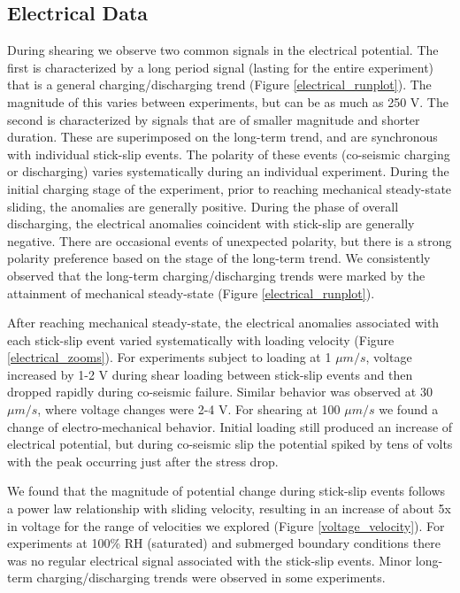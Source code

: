 \subsection{Electrical Data}
During shearing we observe two common signals in the electrical potential.  The first is characterized by a long period signal (lasting for the entire experiment) that is a general charging/discharging trend (Figure \ref{electrical_runplot}).  The magnitude of this varies between experiments, but can be as much as 250 V.  The second is characterized by signals that are of smaller magnitude and shorter duration. These are superimposed on the long-term trend, and are synchronous with individual stick-slip events.  The polarity of these events (co-seismic charging or discharging) varies systematically during an individual experiment.  During the initial charging stage of the experiment, prior to reaching mechanical steady-state sliding, the anomalies are generally positive.  During the phase of overall discharging, the electrical anomalies coincident with stick-slip are generally negative.  There are occasional events of unexpected polarity, but there is a strong polarity preference based on the stage of the long-term trend.  We consistently observed that the long-term charging/discharging trends were marked by the attainment of mechanical steady-state (Figure \ref{electrical_runplot}).

After reaching mechanical steady-state, the electrical anomalies associated with each stick-slip event varied systematically with loading velocity (Figure \ref{electrical_zooms}).  For experiments subject to loading at 1 $\mu m/s$, voltage increased by 1-2 V during shear loading between stick-slip events and then dropped rapidly during co-seismic failure.  Similar behavior was observed at 30 $\mu m/s$, where voltage changes were 2-4 V.  For shearing at 100 $\mu m/s$ we found a change of electro-mechanical behavior. Initial loading still produced an increase of electrical potential, but during co-seismic slip the potential spiked by tens of volts with the peak occurring just after the stress drop.

We found that the magnitude of potential change during stick-slip events follows a power law relationship with sliding velocity, resulting in an increase of about 5x in voltage for the range of velocities we explored (Figure \ref{voltage_velocity}). For experiments at 100\% RH (saturated) and submerged boundary conditions there was no regular electrical signal associated with the stick-slip events. Minor long-term charging/discharging trends were observed in some experiments.  


